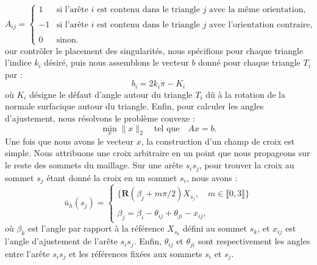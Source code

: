 $$A_{ij} =
\begin{cases}
1 & \text{si l'arête } i \text{ est contenu dans le triangle } j \text{ avec la même orientation}, \\\\
-1 & \text{si l'arête } i \text{ est contenu dans le triangle } j \text{ avec l'orientation contraire}, \\\\
0 & \text{sinon}.
\end{cases}
$$
our contrôler le placement des singularités, nous spécifions pour chaque triangle l'indice $k_i$ désiré, puis nous assemblons le vecteur $b$ donné pour chaque triangle $T_i$ par :
$$
b_i = 2k_i\pi-K_i
$$
où $K_i$ désigne le défaut d'angle autour du triangle $T_i$ dû à la rotation de la normale surfacique autour du triangle. Enfin, pour calculer les angles d'ajustement, nous résolvons le problème convexe :
\[
\min_x \|x\|_2 \quad \text{tel que} \quad Ax = b.
\]
Une fois que nous avons le vecteur $x$, la construction d'un champ de croix est simple. Nous attribuons une croix arbitraire en un point que nous propageons sur le reste des sommets du maillage. Sur une arête $s_is_j$, pour trouver la croix au sommet $s_j$ étant donné la croix en un sommet $s_i$, nous avons :
$$
\bar{u}_h(s_j)=
\begin{cases}
\{\mathbf{R}(\beta_j+m\pi/2)X_{s_j},\quad m\in\llbracket0, 3\rrbracket\}\\\\
\beta_j = \beta_i - \theta_{ij} + \theta_{ji} - x_{ij},
\end{cases}
$$
où $\beta_k$ est l'angle par rapport à la référence $X_{s_k}$ défini au sommet $s_k$, et $x_{ij}$ est l'angle d'ajustement de l'arête $s_is_j$. Enfin, $\theta_{ij}$ et $\theta_{ji}$ sont respectivement les angles entre l'arête $s_is_j$ et les références fixées aux sommets $s_i$ et $s_j$.


